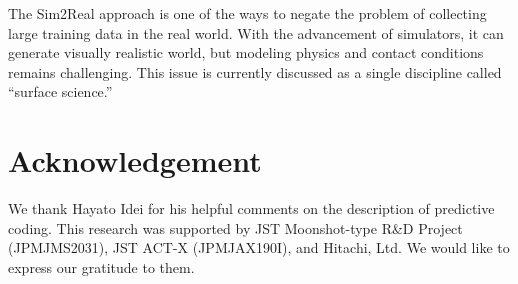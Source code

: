 \documentclass[letterpaper, 10 pt, conference, dvipdfmx]{ieeeconf}  %
\begin{document}
The Sim2Real approach is one of the ways to negate the problem of collecting large training data in the real world. 
With the advancement of simulators, it can generate visually realistic world, but modeling physics and contact conditions remains challenging.
This issue is currently discussed as a single discipline called ``surface science.''







\section*{Acknowledgement}
We thank Hayato Idei for his helpful comments on the description of predictive coding. This research was supported by JST Moonshot-type R\&D Project (JPMJMS2031), JST ACT-X (JPMJAX190I), and Hitachi, Ltd. We would like to express our gratitude to them.

\newpage


\end{document}
